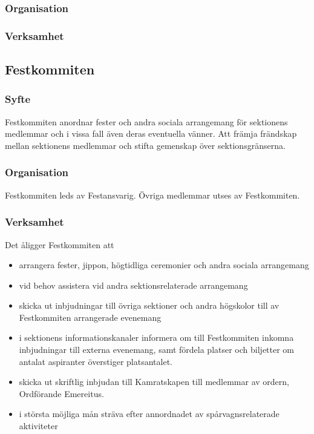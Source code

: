 \documentclass{../resources/dgovdoc}
\begin{document}
\subsubsection{Organisation}

\subsubsection{Verksamhet}

\subsection{Festkommiten}

\subsubsection{Syfte}

Festkommiten anordnar fester och andra sociala arrangemang för sektionens medlemmar och i vissa fall även deras eventuella vänner. Att främja frändskap mellan sektionens medlemmar och stifta gemenskap över sektionsgränserna. 

\subsubsection{Organisation}

Festkommiten leds av Festansvarig. Övriga medlemmar utses av Festkommiten. 

\subsubsection{Verksamhet}

Det åligger Festkommiten att

\begin{itemize}
\item arrangera fester, jippon, högtidliga ceremonier och andra sociala arrangemang
\item vid behov assistera vid andra sektionsrelaterade arrangemang
\item skicka ut inbjudningar till övriga sektioner och andra högskolor till av Festkommiten arrangerade evenemang
\item i sektionens informationskanaler informera om till Festkommiten inkomna inbjudningar till externa evenemang, samt fördela platser och biljetter om antalat aspiranter överstiger platsantalet. 
\item skicka ut skriftlig inbjudan till Kamratskapen till medlemmar av ordern, Ordförande Emereitus. 
\item i största möjliga mån sträva efter annordnadet av spårvagnsrelaterade aktiviteter
\end{itemize}
\end{document}
